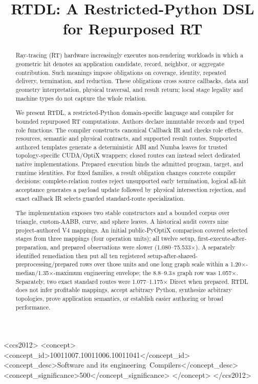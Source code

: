 \documentclass[sigplan,screen,review,anonymous]{acmart}
\title{RTDL: A Restricted-Python DSL for Repurposed RT}
\newcommand{\rtdl}{\textsc{RTDL}\xspace}
\begin{document}
\begin{abstract}
Ray-tracing (RT) hardware increasingly executes non-rendering workloads in
which a geometric hit denotes an application candidate, record, neighbor, or
aggregate contribution. Such meanings impose obligations on coverage,
identity, repeated delivery, termination, and reduction. These obligations
cross source callbacks, data and geometry interpretation, physical traversal,
and result return; local stage legality and machine types do not capture the
whole relation.

We present \rtdl, a restricted-Python domain-specific language and compiler for
bounded repurposed RT computations. Authors declare immutable records and typed
role functions. The compiler constructs canonical Callback IR and checks role
effects, resources, semantic and physical contracts, and supported result
routes. Supported authored templates generate a deterministic ABI and Numba
leaves for trusted topology-specific CUDA/OptiX wrappers; closed routes can
instead select dedicated native implementations. Prepared execution binds the
admitted program, target, and runtime identities. For fixed families, a result
obligation changes concrete compiler decisions: complete-relation routes reject
unsupported early termination, logical all-hit acceptance generates a payload
update followed by physical intersection rejection, and exact callback IR
selects guarded standard-route specialization.

The implementation exposes two stable constructors and a bounded corpus over
triangle, custom-AABB, curve, and sphere leaves. A historical audit covers nine
project-authored V4 mappings. An initial public-PyOptiX comparison covered
selected stages from three mappings (four operation units); all twelve setup,
first-execute-after-preparation, and prepared observations were slower
(1.080--75.533$\times$). A separately identified remediation then put all ten
registered setup-after-shared-preprocessing/prepared rows over those units and
one long graph scale within a 1.20$\times$-median/1.35$\times$-maximum
engineering envelope; the
8.8--9.3\,s graph row was 1.057$\times$. Separately, two exact standard routes
were 1.077--1.175$\times$ Direct when prepared. \rtdl does not infer profitable
mappings, accept arbitrary Python, synthesize arbitrary topologies, prove
application semantics, or establish easier authoring or broad performance.
\end{abstract}

\begin{CCSXML}
<ccs2012>
<concept>
<concept_id>10011007.10011006.10011041</concept_id>
<concept_desc>Software and its engineering~Compilers</concept_desc>
<concept_significance>500</concept_significance>
</concept>
</ccs2012>
\end{CCSXML}
\end{document}
